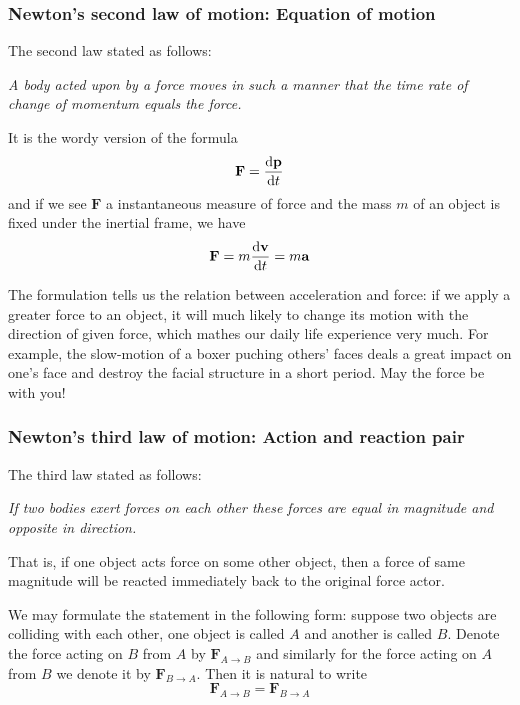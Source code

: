 \documentclass[12pt]{article}
\begin{document}
    \subsubsection*{Newton's second law of motion: Equation of motion}

    The second law stated as follows:

    \begin{center}
        \textit{A body acted upon by a force moves in such a manner that the time rate of change of momentum equals the force.}
    \end{center}

    It is the wordy version of the formula \[\mathbf{F}=\derivative{\mathbf{p}}{t}\] and if we see $\mathbf{F}$ a instantaneous measure of force and the mass $m$ of an object is fixed under the inertial frame, we have \[\mathbf{F}=m\derivative{\mathbf{v}}{t}=m\mathbf{a}\]

    The formulation tells us the relation between acceleration and force: if we apply a greater force to an object, it will much likely to change its motion with the direction of given force, which mathes our daily life experience very much. For example, the slow-motion of a boxer puching others' faces deals a great impact on one's face and destroy the facial structure in a short period. May the force be with you!

    \subsubsection*{Newton's third law of motion: Action and reaction pair}

    The third law stated as follows:

    \begin{center}
        \textit{If two bodies exert forces on each other these forces are equal in magnitude and opposite in direction.}
    \end{center}

    That is, if one object acts force on some other object, then a force of same magnitude will be reacted immediately back to the original force actor.

    We may formulate the statement in the following form: suppose two objects are colliding with each other, one object is called $A$ and another is called $B$. Denote the force acting on $B$ from $A$ by $\mathbf{F}_{A\to B}$ and similarly for the force acting on $A$ from $B$ we denote it by $\mathbf{F}_{B\to A}$. Then it is natural to write \[\mathbf{F}_{A\to B}=\mathbf{F}_{B\to A}\]
\end{document}
